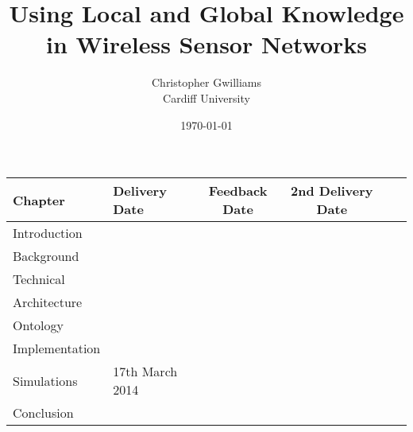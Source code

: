 \documentclass[12pt, a4paper]{report}
\begin{document}
\title{Using Local and Global Knowledge in Wireless Sensor Networks}
\author{Christopher Gwilliams\\Cardiff University}
\date{\today}
\maketitle 

		\begin{table*}
			\hfill{}
			\begin{tabular}{|l|l|c|c|c|c|}
				\hline
					Chapter & Delivery Date & Feedback Date & 2nd Delivery Date \\
				\hline
					Introduction & & & \\
					Background & & & \\
					Technical & & & \\
					Architecture & & & \\
					Ontology & & & \\
					Implementation & & & \\
					Simulations & 17th March 2014 & & \\
					Conclusion & & & \\			
				\hline
			\end{tabular}
			\hfill{}
		\end{table*}		

\tableofcontents
\listoffigures
\listoftables
\end{document}
